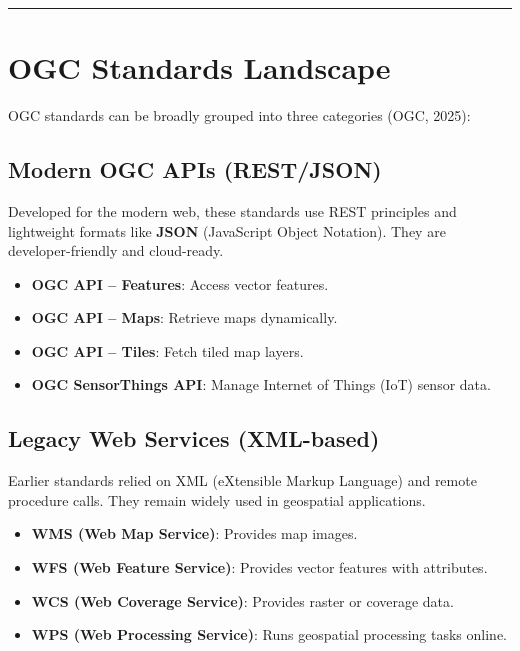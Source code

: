 \documentclass[
  11pt,
  letterpaper,
]{book}
\providecommand{\tightlist}{%
  \setlength{\itemsep}{0pt}\setlength{\parskip}{0pt}}
\begin{document}
\begin{center}\rule{0.5\linewidth}{0.5pt}\end{center}

\section{OGC Standards Landscape}\label{ogc-standards-landscape}

OGC standards can be broadly grouped into three categories (OGC, 2025):

\subsection{Modern OGC APIs (REST/JSON)}\label{modern-ogc-apis-restjson}

Developed for the modern web, these standards use REST principles and
lightweight formats like \textbf{JSON} (JavaScript Object Notation).
They are developer-friendly and cloud-ready.

\begin{itemize}
\tightlist
\item
  \textbf{OGC API -- Features}: Access vector features.\\
\item
  \textbf{OGC API -- Maps}: Retrieve maps dynamically.\\
\item
  \textbf{OGC API -- Tiles}: Fetch tiled map layers.\\
\item
  \textbf{OGC SensorThings API}: Manage Internet of Things (IoT) sensor
  data.
\end{itemize}

\subsection{Legacy Web Services
(XML-based)}\label{legacy-web-services-xml-based}

Earlier standards relied on XML (eXtensible Markup Language) and remote
procedure calls. They remain widely used in geospatial applications.

\begin{itemize}
\tightlist
\item
  \textbf{WMS (Web Map Service)}: Provides map images.\\
\item
  \textbf{WFS (Web Feature Service)}: Provides vector features with
  attributes.\\
\item
  \textbf{WCS (Web Coverage Service)}: Provides raster or coverage
  data.\\
\item
  \textbf{WPS (Web Processing Service)}: Runs geospatial processing
  tasks online.
\end{itemize}
\end{document}
